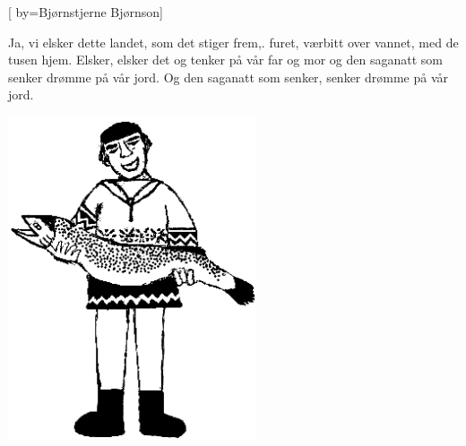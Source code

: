 
[
by={Bjørnstjerne Bjørnson}]

\beginverse*
Ja, vi elsker dette landet,
som det stiger frem,.
furet, værbitt over vannet,
med de tusen hjem.
Elsker, elsker det og tenker
på vår far og mor
og den saganatt som senker
drømme på vår jord.
Og den saganatt som senker,
senker drømme på vår jord.
\endverse
\endsong

\begin{intersong}
	\begin{center}
		\includegraphics[width=0.55\textwidth]{../bilder/fardigabilder/CamillasFardigaBilder/Norgesnationalsang2.png} 
	\end{center}
\end{intersong}


